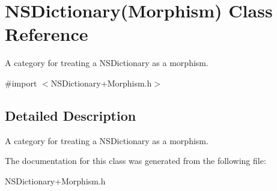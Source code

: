 \hypertarget{interface_n_s_dictionary_07_morphism_08}{\section{N\-S\-Dictionary(Morphism) Class Reference}
\label{interface_n_s_dictionary_07_morphism_08}
}


A category for treating a N\-S\-Dictionary as a morphism.  




{\ttfamily \#import $<$N\-S\-Dictionary+\-Morphism.\-h$>$}



\subsection{Detailed Description}
A category for treating a N\-S\-Dictionary as a morphism. 

The documentation for this class was generated from the following file\-:\begin{DoxyCompactItemize}
\item 
N\-S\-Dictionary+\-Morphism.\-h\end{DoxyCompactItemize}
